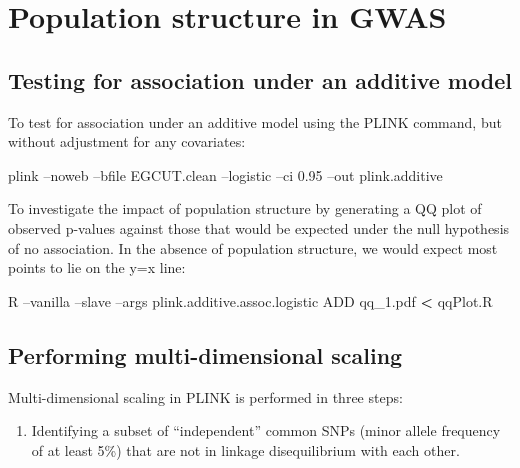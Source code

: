 \documentclass[]{book}
\newenvironment{Shaded}{\begin{snugshade}}{\end{snugshade}}
\newcommand{\OperatorTok}[1]{\textcolor[rgb]{0.81,0.36,0.00}{\textbf{#1}}}
\newcommand{\ExtensionTok}[1]{#1}
\newcommand{\NormalTok}[1]{#1}
\providecommand{\tightlist}{%
  \setlength{\itemsep}{0pt}\setlength{\parskip}{0pt}}
\begin{document}
\section{Population structure in
GWAS}\label{population-structure-in-gwas}

\subsection{Testing for association under an additive
model}\label{testing-for-association-under-an-additive-model}

To test for association under an additive model using the PLINK command,
but without adjustment for any covariates:

\begin{Shaded}
\begin{Highlighting}[]
\ExtensionTok{plink}\NormalTok{ --noweb --bfile EGCUT.clean --logistic --ci 0.95 --out plink.additive}
\end{Highlighting}
\end{Shaded}

To investigate the impact of population structure by generating a QQ
plot of observed p-values against those that would be expected under the
null hypothesis of no association. In the absence of population
structure, we would expect most points to lie on the y=x line:

\begin{Shaded}
\begin{Highlighting}[]
\ExtensionTok{R}\NormalTok{ --vanilla --slave --args plink.additive.assoc.logistic ADD qq_1.pdf }\OperatorTok{<}\NormalTok{ qqPlot.R}
\end{Highlighting}
\end{Shaded}

\subsection{Performing multi-dimensional
scaling}\label{performing-multi-dimensional-scaling}

Multi-dimensional scaling in PLINK is performed in three steps:

\begin{enumerate}
\def\labelenumi{\arabic{enumi}.}
\tightlist
\item
  Identifying a subset of ``independent'' common SNPs (minor allele
  frequency of at least 5\%) that are not in linkage disequilibrium with
  each other.
\end{enumerate}
\end{document}

